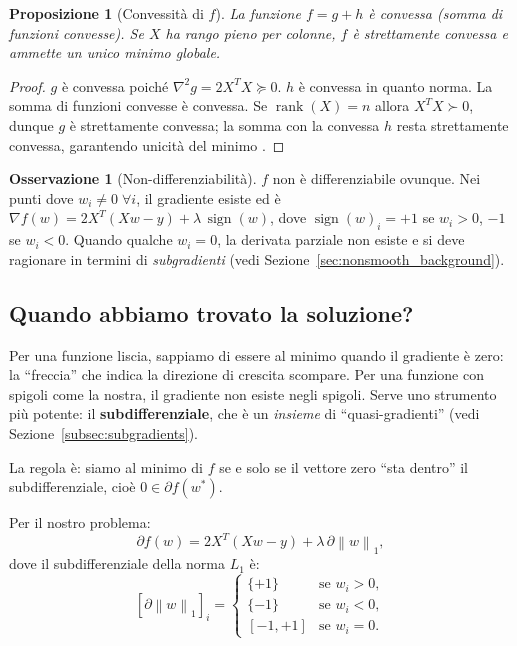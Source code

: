 \documentclass[a4paper,11pt]{article}
\newtheorem{proposition}[theorem]{Proposizione}
\theoremstyle{definition}
\newtheorem{remark}[theorem]{Osservazione}
\newcommand{\norm}[1]{\left\lVert #1 \right\rVert}
\DeclareMathOperator{\sign}{sign}
\DeclareMathOperator{\rank}{rank}
\begin{document}
\begin{proposition}[Convessità di $f$]
La funzione $f = g + h$ è convessa (somma di funzioni convesse). Se $X$ ha rango pieno per colonne, $f$ è strettamente convessa e ammette un unico minimo globale.
\end{proposition}

\begin{proof}
$g$ è convessa poiché $\nabla^2 g = 2X^TX \succeq 0$. $h$ è convessa in quanto norma. La somma di funzioni convesse è convessa. Se $\rank(X)=n$ allora $X^TX \succ 0$, dunque $g$ è strettamente convessa; la somma con la convessa $h$ resta strettamente convessa, garantendo unicità del minimo \cite[slide~3, set~3]{opt-slides}.
\end{proof}

\begin{remark}[Non-differenziabilità]
$f$ non è differenziabile ovunque. Nei punti dove $w_i \neq 0\;\forall i$, il gradiente esiste ed è $\nabla f(w) = 2X^T(Xw - y) + \lambda\,\sign(w)$, dove $\sign(w)_i = +1$ se $w_i > 0$, $-1$ se $w_i < 0$. Quando qualche $w_i = 0$, la derivata parziale non esiste e si deve ragionare in termini di \emph{subgradienti} (vedi Sezione~\ref{sec:nonsmooth_background}).
\end{remark}

\subsection{Quando abbiamo trovato la soluzione?}
\label{subsec:ottimalita}

\begin{intuizione}
Per una funzione liscia, sappiamo di essere al minimo quando il gradiente è zero: la ``freccia'' che indica la direzione di crescita scompare. Per una funzione con spigoli come la nostra, il gradiente non esiste negli spigoli. Serve uno strumento più potente: il \textbf{subdifferenziale}, che è un \emph{insieme} di ``quasi-gradienti'' (vedi Sezione~\ref{subsec:subgradients}).

La regola è: siamo al minimo di $f$ se e solo se il vettore zero ``sta dentro'' il subdifferenziale, cioè $0 \in \partial f(w^*)$.
\end{intuizione}

Per il nostro problema:
\[
  \partial f(w) = 2X^T(Xw - y) + \lambda\,\partial\norm{w}_1,
\]
dove il subdifferenziale della norma $L_1$ è:
\[
  [\partial\norm{w}_1]_i = \begin{cases} \{+1\} & \text{se } w_i > 0,\\ \{-1\} & \text{se } w_i < 0,\\ [-1, +1] & \text{se } w_i = 0. \end{cases}
\]
\end{document}
